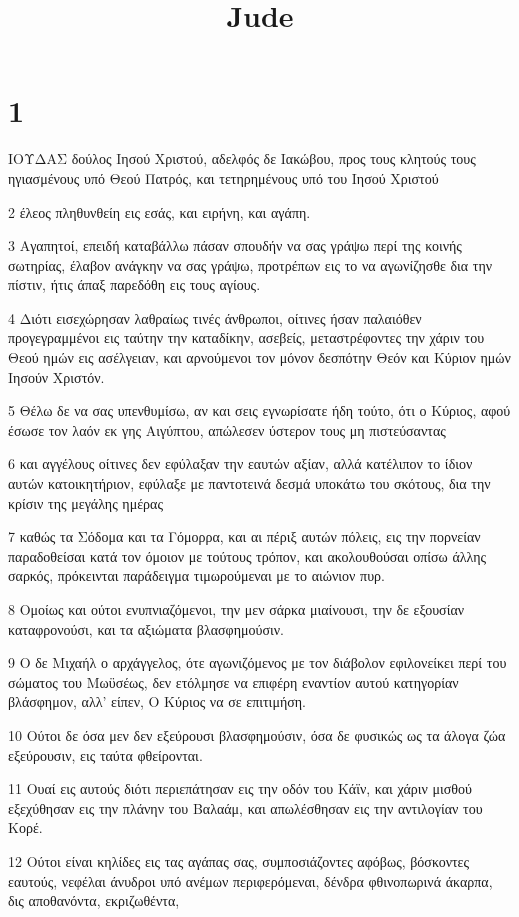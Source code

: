

\title{Jude}


\chapter{1}

\par ΙΟΥΔΑΣ δούλος Ιησού Χριστού, αδελφός δε Ιακώβου, προς τους κλητούς τους ηγιασμένους υπό Θεού Πατρός, και τετηρημένους υπό του Ιησού Χριστού
\par 2 έλεος πληθυνθείη εις εσάς, και ειρήνη, και αγάπη.
\par 3 Αγαπητοί, επειδή καταβάλλω πάσαν σπουδήν να σας γράψω περί της κοινής σωτηρίας, έλαβον ανάγκην να σας γράψω, προτρέπων εις το να αγωνίζησθε δια την πίστιν, ήτις άπαξ παρεδόθη εις τους αγίους.
\par 4 Διότι εισεχώρησαν λαθραίως τινές άνθρωποι, οίτινες ήσαν παλαιόθεν προγεγραμμένοι εις ταύτην την καταδίκην, ασεβείς, μεταστρέφοντες την χάριν του Θεού ημών εις ασέλγειαν, και αρνούμενοι τον μόνον δεσπότην Θεόν και Κύριον ημών Ιησούν Χριστόν.
\par 5 Θέλω δε να σας υπενθυμίσω, αν και σεις εγνωρίσατε ήδη τούτο, ότι ο Κύριος, αφού έσωσε τον λαόν εκ γης Αιγύπτου, απώλεσεν ύστερον τους μη πιστεύσαντας
\par 6 και αγγέλους οίτινες δεν εφύλαξαν την εαυτών αξίαν, αλλά κατέλιπον το ίδιον αυτών κατοικητήριον, εφύλαξε με παντοτεινά δεσμά υποκάτω του σκότους, δια την κρίσιν της μεγάλης ημέρας
\par 7 καθώς τα Σόδομα και τα Γόμορρα, και αι πέριξ αυτών πόλεις, εις την πορνείαν παραδοθείσαι κατά τον όμοιον με τούτους τρόπον, και ακολουθούσαι οπίσω άλλης σαρκός, πρόκεινται παράδειγμα τιμωρούμεναι με το αιώνιον πυρ.
\par 8 Ομοίως και ούτοι ενυπνιαζόμενοι, την μεν σάρκα μιαίνουσι, την δε εξουσίαν καταφρονούσι, και τα αξιώματα βλασφημούσιν.
\par 9 Ο δε Μιχαήλ ο αρχάγγελος, ότε αγωνιζόμενος με τον διάβολον εφιλονείκει περί του σώματος του Μωϋσέως, δεν ετόλμησε να επιφέρη εναντίον αυτού κατηγορίαν βλάσφημον, αλλ' είπεν, Ο Κύριος να σε επιτιμήση.
\par 10 Ούτοι δε όσα μεν δεν εξεύρουσι βλασφημούσιν, όσα δε φυσικώς ως τα άλογα ζώα εξεύρουσιν, εις ταύτα φθείρονται.
\par 11 Ουαί εις αυτούς διότι περιεπάτησαν εις την οδόν του Κάϊν, και χάριν μισθού εξεχύθησαν εις την πλάνην του Βαλαάμ, και απωλέσθησαν εις την αντιλογίαν του Κορέ.
\par 12 Ούτοι είναι κηλίδες εις τας αγάπας σας, συμποσιάζοντες αφόβως, βόσκοντες εαυτούς, νεφέλαι άνυδροι υπό ανέμων περιφερόμεναι, δένδρα φθινοπωρινά άκαρπα, δις αποθανόντα, εκριζωθέντα,
